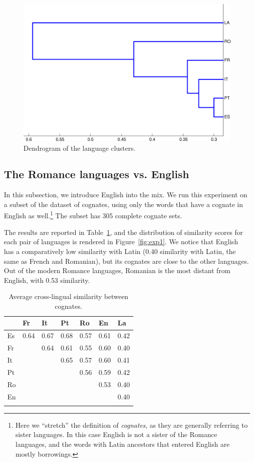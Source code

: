 \documentclass[output=paper]{langsci/langscibook}
\begin{document}
\begin{figure}[p]
\center
\includegraphics[width=0.8\linewidth]{figures/UBAN_dendrogram.png}
\caption{\label{fig:dendrogram_cognates}Dendrogram of the language clusters.}
\end{figure}

\subsection{The Romance languages vs. English}\largerpage

In this subsection, we introduce English into the mix. We run this experiment on a subset of the dataset of cognates, using only the words that have a cognate in English as well.\footnote{Here we ``stretch'' the definition of \emph{cognates}, as they are generally referring to sister languages. In this case English is not a sister of the Romance languages, and the words with Latin ancestors that entered English are mostly borrowings.} The subset has 305 complete cognate sets.

The results are reported in Table~\ref{table:cognate_similarity_en}, and the distribution of similarity scores for each pair of languages is rendered in Figure~\ref{fig:exp1}. We notice that English has a comparatively low similarity with Latin (0.40 similarity with Latin, the same as French and Romanian), but its cognates are close to the other languages. Out of the modern Romance languages, Romanian is the most distant from English, with 0.53 similarity.

\begin{table}[!ht]
\begin{center}
\begin{tabular}{l l l l l l l}
\lsptoprule
& Fr & It & Pt & Ro & En & La\\
\midrule

Es & 0.64 & 0.67 & 0.68 & 0.57 & 0.61 & 0.42 \\
Fr & & 0.64 & 0.61 & 0.55 & 0.60 & 0.40 \\
It & & & 0.65 & 0.57 & 0.60 & 0.41 \\
Pt & & & & 0.56 & 0.59 & 0.42 \\
Ro & & & & & 0.53 & 0.40 \\
En & & & & & & 0.40 \\
\lspbottomrule

\end{tabular}
\end{center}
\caption{\label{table:cognate_similarity_en}Average cross-lingual similarity between cognates.}
\end{table}
\end{document}
